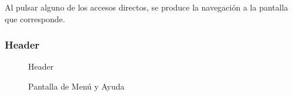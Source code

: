\documentclass[a4paper, 12pt]{book}
\begin{document}
Al pulsar alguno de los accesos directos, se produce la navegaci\'on a la pantalla que corresponde.


\subsubsection{Header}
\label{sec:header}

\begin{figure}[H]
 \centering
 \caption{Header}
 \label{f:header}
\end{figure}

\begin{figure}[H]
 \centering
 \caption{Pantalla de Men\'u y Ayuda}
 \label{f:header}
\end{figure}
\end{document}

